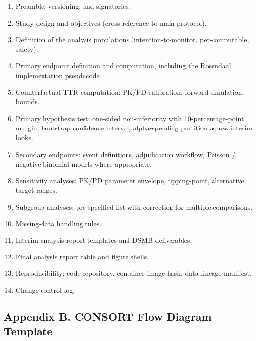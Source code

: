 \documentclass[11pt]{article}
\begin{document}
\begin{enumerate}
  \item Preamble, versioning, and signatories.
  \item Study design and objectives (cross-reference to main protocol).
  \item Definition of the analysis populations (intention-to-monitor, per-computable, safety).
  \item Primary endpoint definition and computation, including the Rosendaal implementation pseudocode \citep{rosendaal1993}.
  \item Counterfactual TTR computation: PK/PD calibration, forward simulation, bounds.
  \item Primary hypothesis test: one-sided non-inferiority with 10-percentage-point margin, bootstrap confidence interval, alpha-spending partition across interim looks.
  \item Secondary endpoints: event definitions, adjudication workflow, Poisson / negative-binomial models where appropriate.
  \item Sensitivity analyses: PK/PD parameter envelope, tipping-point, alternative target ranges.
  \item Subgroup analyses: pre-specified list with correction for multiple comparisons.
  \item Missing-data handling rules.
  \item Interim analysis report templates and DSMB deliverables.
  \item Final analysis report table and figure shells.
  \item Reproducibility: code repository, container image hash, data lineage manifest.
  \item Change-control log.
\end{enumerate}

\subsection{Appendix B. CONSORT Flow Diagram Template}
\end{document}
